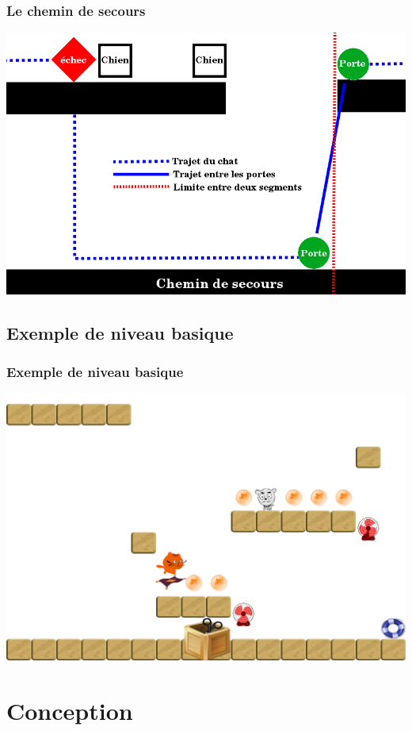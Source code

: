 \documentclass{beamer}
\begin{document}
\begin{frame}
\frametitle{Le chemin de secours}

\centering \includegraphics[scale=0.3]{images/secours.png}

\end{frame}


\subsection{Exemple de niveau basique}

\begin{frame}
\frametitle{Exemple de niveau basique}
\centering \includegraphics[scale=0.19]{images/simple_level.png}

\end{frame}

\section{Conception}
\end{document}
